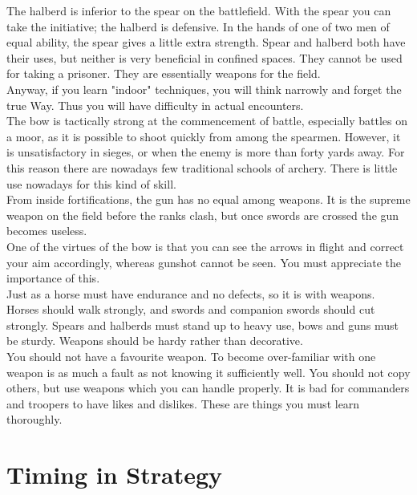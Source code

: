 The halberd is inferior to the spear on the battlefield. With the spear you can take the initiative; the halberd is defensive. In the hands of one of two men of equal ability, the spear gives a little extra strength. Spear and halberd both have their uses, but neither is very beneficial in confined spaces. They cannot be used for taking a prisoner. They are essentially weapons for the field.\\

Anyway, if you learn "indoor" techniques, you will think narrowly and forget the true Way. Thus you will have difficulty in actual encounters.\\

The bow is tactically strong at the commencement of battle, especially battles on a moor, as it is possible to shoot quickly from among the spearmen. However, it is unsatisfactory in sieges, or when the enemy is more than forty yards away. For this reason there are nowadays few traditional schools of archery. There is little use nowadays for this kind of skill.\\

From inside fortifications, the gun has no equal among weapons. It is the supreme weapon on the field before the ranks clash, but once swords are crossed the gun becomes useless.\\

One of the virtues of the bow is that you can see the arrows in flight and correct your aim accordingly, whereas gunshot cannot be seen. You must appreciate the importance of this.\\

Just as a horse must have endurance and no defects, so it is with weapons. Horses should walk strongly, and swords and companion swords should cut strongly. Spears and halberds must stand up to heavy use, bows and guns must be sturdy. Weapons should be hardy rather than decorative.\\

You should not have a favourite weapon. To become over-familiar with one weapon is as much a fault as not knowing it sufficiently well. You should not copy others, but use weapons which you can handle properly. It is bad for commanders and troopers to have likes and dislikes. These are things you must learn thoroughly.\\
\section{Timing in Strategy}


